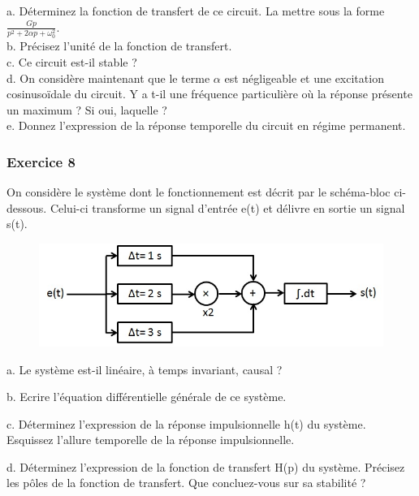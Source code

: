  	a. Déterminez la fonction de transfert de ce circuit. La mettre sous la forme $\frac{Gp}{p^2+2\alpha p+\omega_{0}^{2}}$.\\
 	
 	b. Précisez l'unité de la fonction de transfert. \\
 	
 	c. Ce circuit est-il stable ?\\
 	
 	d. On considère maintenant que le terme $\alpha$ est négligeable et une excitation cosinusoïdale du circuit. Y a t-il une fréquence particulière où la réponse présente un maximum ? Si oui, laquelle ? \\
 	
 	e. Donnez l'expression de la réponse temporelle du circuit en régime permanent.\\
	
	\vspace{1\baselineskip}
	
	\subsubsection{Exercice 8}
	
	On considère le système dont le fonctionnement est décrit par le schéma-bloc ci-dessous. Celui-ci transforme un signal d'entrée e(t) et délivre en sortie un signal s(t). 
	
	\begin{figure}[h!]
		\centering
		\includegraphics[scale=0.5]{images/Exo_2_6.jpg} 
	\end{figure}
	
	a. Le système est-il linéaire, à temps invariant, causal ?
	
	b. Ecrire l'équation différentielle générale de ce système.
	
	c. Déterminez l'expression de la réponse impulsionnelle h(t) du système. Esquissez l'allure temporelle de la réponse impulsionnelle. 
	
	d. Déterminez l'expression de la fonction de transfert H(p) du système. Précisez les pôles de la fonction de transfert. Que concluez-vous sur sa stabilité ?
	

	



